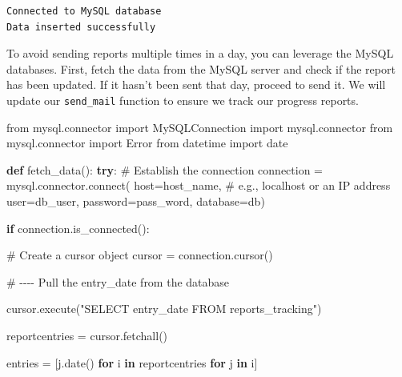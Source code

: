 \documentclass[
  letterpaper,
  DIV=11,
  numbers=noendperiod]{scrreprt}
\newenvironment{Shaded}{\begin{snugshade}}{\end{snugshade}}
\newcommand{\CommentTok}[1]{\textcolor[rgb]{0.37,0.37,0.37}{#1}}
\newcommand{\ControlFlowTok}[1]{\textcolor[rgb]{0.00,0.23,0.31}{\textbf{#1}}}
\newcommand{\ExtensionTok}[1]{\textcolor[rgb]{0.00,0.23,0.31}{#1}}
\newcommand{\ImportTok}[1]{\textcolor[rgb]{0.00,0.46,0.62}{#1}}
\newcommand{\KeywordTok}[1]{\textcolor[rgb]{0.00,0.23,0.31}{\textbf{#1}}}
\newcommand{\NormalTok}[1]{\textcolor[rgb]{0.00,0.23,0.31}{#1}}
\newcommand{\OperatorTok}[1]{\textcolor[rgb]{0.37,0.37,0.37}{#1}}
\newcommand{\StringTok}[1]{\textcolor[rgb]{0.13,0.47,0.30}{#1}}
\begin{document}
\begin{verbatim}
Connected to MySQL database
Data inserted successfully
\end{verbatim}

To avoid sending reports multiple times in a day, you can leverage the
MySQL databases. First, fetch the data from the MySQL server and check
if the report has been updated. If it hasn't been sent that day, proceed
to send it. We will update our \texttt{send\_mail} function to ensure we
track our progress reports.

\begin{Shaded}
\begin{Highlighting}[]
\ImportTok{from}\NormalTok{ mysql.connector }\ImportTok{import}\NormalTok{ MySQLConnection}
\ImportTok{import}\NormalTok{ mysql.connector}
\ImportTok{from}\NormalTok{ mysql.connector }\ImportTok{import}\NormalTok{ Error}
\ImportTok{from}\NormalTok{ datetime }\ImportTok{import}\NormalTok{ date}

\KeywordTok{def}\NormalTok{ fetch\_data():}
  \ControlFlowTok{try}\NormalTok{:}
        \CommentTok{\# Establish the connection}
\NormalTok{        connection }\OperatorTok{=}\NormalTok{ mysql.connector.}\ExtensionTok{connect}\NormalTok{(}
\NormalTok{            host}\OperatorTok{=}\NormalTok{host\_name,  }\CommentTok{\# e.g., \textquotesingle{}localhost\textquotesingle{} or an IP address}
\NormalTok{            user}\OperatorTok{=}\NormalTok{db\_user,}
\NormalTok{            password}\OperatorTok{=}\NormalTok{pass\_word,}
\NormalTok{            database}\OperatorTok{=}\NormalTok{db)     }

        \ControlFlowTok{if}\NormalTok{ connection.is\_connected():}
          
                \CommentTok{\# Create a cursor object}
\NormalTok{                cursor }\OperatorTok{=}\NormalTok{ connection.cursor()}

                \CommentTok{\# {-}{-}{-}{-} Pull the entry\_date from the database}

\NormalTok{                cursor.execute(}\StringTok{"SELECT entry\_date FROM reports\_tracking"}\NormalTok{)}
                
\NormalTok{                reportcentries }\OperatorTok{=}\NormalTok{ cursor.fetchall()}
                
\NormalTok{                entries }\OperatorTok{=}\NormalTok{ [j.date() }\ControlFlowTok{for}\NormalTok{ i }\KeywordTok{in}\NormalTok{ reportcentries }\ControlFlowTok{for}\NormalTok{ j }\KeywordTok{in}\NormalTok{ i]}
                

\end{Highlighting}
\end{Shaded}
\end{document}
